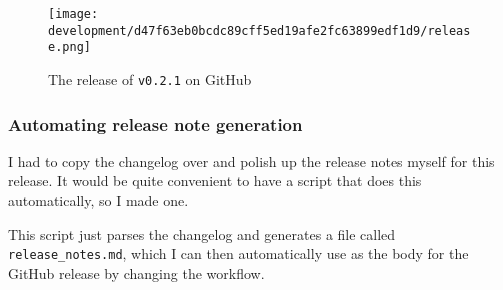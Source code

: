 \documentclass[../development.tex]{subfiles}
\begin{document}


\begin{figure}[H]
	\centering
	\texttt{[image: development/d47f63eb0bcdc89cff5ed19afe2fc63899edf1d9/release.png]}
	\caption{The release of \texttt{v0.2.1} on GitHub}
	\label{fig:development:d47f63eb0bcdc89cff5ed19afe2fc63899edf1d9:release.png}
\end{figure}

\subsubsection{Automating release note generation\label{development:preparing-for-v0.2.1:automating-release-note-generation}}

I had to copy the changelog over and polish up the release notes myself for this release. It would be quite convenient to have a script that does this automatically, so I made one.


This script just parses the changelog and generates a file called \texttt{release\_notes.md}, which I can then automatically use as the body for the GitHub release by changing the workflow.

\end{document}

